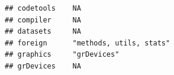\documentclass[]{article}
\begin{document}
\begin{verbatim}
## codetools    NA                                                                                                                                                                                                                                                                                                                                                                                                                                                                                    
## compiler     NA                                                                                                                                                                                                                                                                                                                                                                                                                                                                                    
## datasets     NA                                                                                                                                                                                                                                                                                                                                                                                                                                                                                    
## foreign      "methods, utils, stats"                                                                                                                                                                                                                                                                                                                                                                                                                                                               
## graphics     "grDevices"                                                                                                                                                                                                                                                                                                                                                                                                                                                                           
## grDevices    NA                                                                                                                                                                                                                                                                                                                                                                                                                                                                                    

\end{verbatim}
\end{document}
